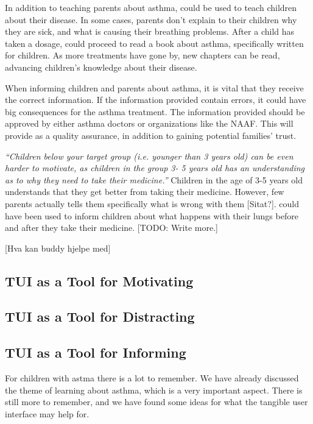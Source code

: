 In addition to teaching parents about asthma, \buddy{} could be used to teach children about their disease. In some cases, parents don't explain to their children why they are sick, and what is causing their breathing problems. After a child has taken a dosage, \buddy{} could proceed to read a book about asthma, specifically written for children. As more treatments have gone by, new chapters can be read, advancing children's knowledge about their disease.   

When informing children and parents about asthma, it is vital that they receive the correct information. If the information provided contain errors, it could have big consequences for the asthma treatment. The information provided should be approved by either asthma doctors or organizations like the NAAF. This will provide as a quality assurance, in addition to gaining potential families' trust.    

\textit{``Children below your target group (i.e. younger than 3 years old) can be even harder to motivate, as children in the group 3- 5 years old has an understanding as to why they need to take their medicine.''}
Children in the age of 3-5 years old understands that they get better from taking their medicine. However, few parents actually tells them specifically what is wrong with them [Sitat?]. \buddy{} could have been used to inform children about what happens with their lungs before and after they take their medicine. 
[TODO: Write more.] 

[Hva kan buddy hjelpe med]

\subsection{TUI as a Tool for Motivating}


\subsection{TUI as a Tool for Distracting} 


\subsection{TUI as a Tool for Informing}
For children with astma there is a lot to remember. We have already discussed the theme of learning about asthma, which is a very important aspect. There is still more to remember, and we have found some ideas for what the tangible user interface may help for. 

